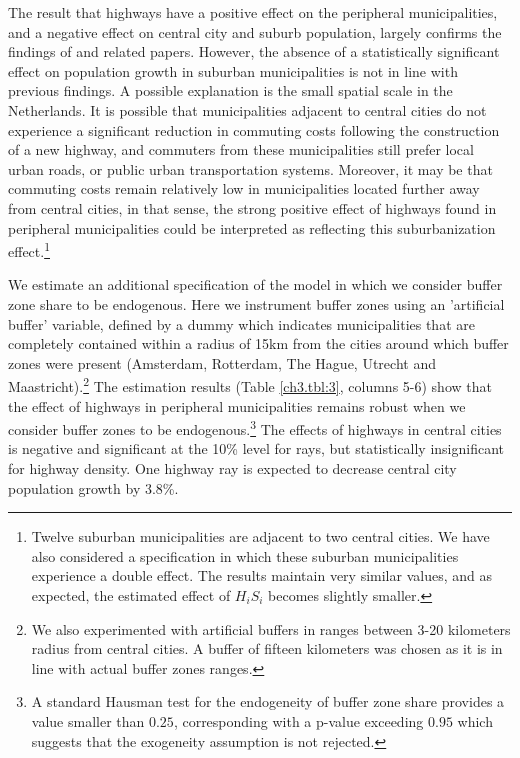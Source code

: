 \documentclass[a4paper,authoryear,review]{elsarticle}  	%
\begin{document}
	The result that highways have a positive effect on the peripheral municipalities, and a negative effect on central city and suburb population, largely confirms the findings of \citet{Baum-Snow2007,Baum-Snow2007a} and related papers. However, the absence of a statistically significant effect on population growth in suburban municipalities is not in line with previous findings. 
	A possible explanation is the small spatial scale in the Netherlands. It is possible that municipalities adjacent to central cities do not experience a significant reduction in commuting costs following the construction of a new highway, and commuters from these municipalities still prefer local urban roads, or public urban transportation systems. Moreover, it may be that commuting costs remain relatively low in municipalities located further away from central cities, in that sense, the strong positive effect of highways found in peripheral municipalities could be interpreted as reflecting this suburbanization effect.\footnote{Twelve suburban municipalities are adjacent to two central cities. We have also considered a specification in which these suburban municipalities experience a double effect. %
	The results maintain very similar values, and as expected, the estimated effect of $H_{i}S_i$ becomes slightly smaller.} 	
		
	We estimate an additional specification of the model in which we consider buffer zone share to be endogenous. Here we instrument buffer zones using an 'artificial buffer' variable, defined by a dummy which indicates municipalities that are completely contained within a radius of 15km from the cities around which buffer zones were present (Amsterdam, Rotterdam, The Hague, Utrecht and Maastricht).\footnote{We also experimented with artificial buffers in ranges between 3-20 kilometers radius from central cities. A buffer of fifteen kilometers was chosen as it is in line with actual buffer zones ranges.} The estimation results (Table \ref{ch3.tbl:3}, columns 5-6) show that the effect of highways in peripheral municipalities remains robust when we consider buffer zones to be endogenous.\footnote{A standard Hausman test for the endogeneity of buffer zone share provides a value smaller than $0.25$, corresponding with a p-value exceeding $0.95$ which suggests that the exogeneity assumption is not rejected.} The effects of highways in central cities is negative and significant at the 10\% level for rays, but statistically insignificant for highway density. One highway ray is expected to decrease central city population growth by 3.8\%.
	
\end{document}
